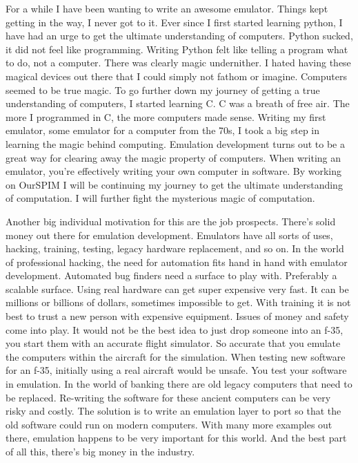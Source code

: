 \documentclass[parskip=half, fontsize=12pt]{scrartcl}
\begin{document}
For a while I have been wanting to write an awesome emulator. Things kept getting in the way, I never got to it. Ever since I first started learning python, I have had an urge to get the ultimate understanding of computers. Python sucked, it did not feel like programming. Writing Python felt like telling a program what to do, not a computer. There was clearly magic undernither. I hated having these magical devices out there that I could simply not fathom or imagine. Computers seemed to be true magic. To go further down my journey of getting a true understanding of computers, I started learning C. C was a breath of free air. The more I programmed in C, the more computers made sense. Writing my first emulator, some emulator for a computer from the 70s, I took a big step in learning the magic behind computing. Emulation development turns out to be a great way for clearing away the magic property of computers. When writing an emulator, you're effectively writing your own computer in software. By working on OurSPIM I will be continuing my journey to get the ultimate understanding of computation. I will further fight the mysterious magic of computation.

Another big individual motivation for this are the job prospects. There's solid money out there for emulation development. Emulators have all sorts of uses, hacking, training, testing, legacy hardware replacement, and so on. In the world of professional hacking, the need for automation fits hand in hand with emulator development. Automated bug finders need a surface to play with. Preferably a scalable surface. Using real hardware can get super expensive very fast. It can be millions or billions of dollars, sometimes impossible to get. With training it is not best to trust a new person with expensive equipment. Issues of money and safety come into play. It would not be the best idea to just drop someone into an f-35, you start them with an accurate flight simulator. So accurate that you emulate the computers within the aircraft for the simulation. When testing new software for an f-35, initially using a real aircraft would be unsafe. You test your software in emulation. In the world of banking there are old legacy computers that need to be replaced. Re-writing the software for these ancient computers can be very risky and costly. The solution is to write an emulation layer to port so that the old software could run on modern computers. With many more examples out there, emulation happens to be very important for this world. And the best part of all this, there's big money in the industry.
\end{document}
